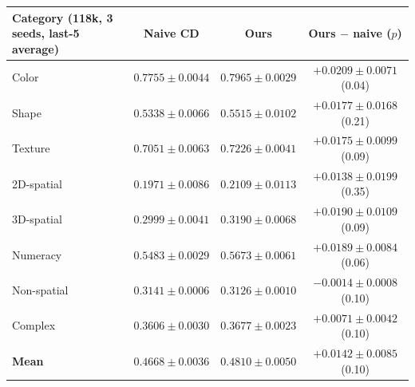 \begin{tabular}{l c c c}
\toprule
Category (118k, 3 seeds, last-5 average) & Naive CD & Ours & Ours $-$ naive ($p$) \\
\midrule
Color & $0.7755\pm0.0044$ & $0.7965\pm0.0029$ & $+0.0209\pm0.0071$ (0.04) \\
Shape & $0.5338\pm0.0066$ & $0.5515\pm0.0102$ & $+0.0177\pm0.0168$ (0.21) \\
Texture & $0.7051\pm0.0063$ & $0.7226\pm0.0041$ & $+0.0175\pm0.0099$ (0.09) \\
2D-spatial & $0.1971\pm0.0086$ & $0.2109\pm0.0113$ & $+0.0138\pm0.0199$ (0.35) \\
3D-spatial & $0.2999\pm0.0041$ & $0.3190\pm0.0068$ & $+0.0190\pm0.0109$ (0.09) \\
Numeracy & $0.5483\pm0.0029$ & $0.5673\pm0.0061$ & $+0.0189\pm0.0084$ (0.06) \\
Non-spatial & $0.3141\pm0.0006$ & $0.3126\pm0.0010$ & $-0.0014\pm0.0008$ (0.10) \\
Complex & $0.3606\pm0.0030$ & $0.3677\pm0.0023$ & $+0.0071\pm0.0042$ (0.10) \\
\midrule
\textbf{Mean} & $0.4668\pm0.0036$ & $0.4810\pm0.0050$ & $+0.0142\pm0.0085$ (0.10) \\
\bottomrule
\end{tabular}